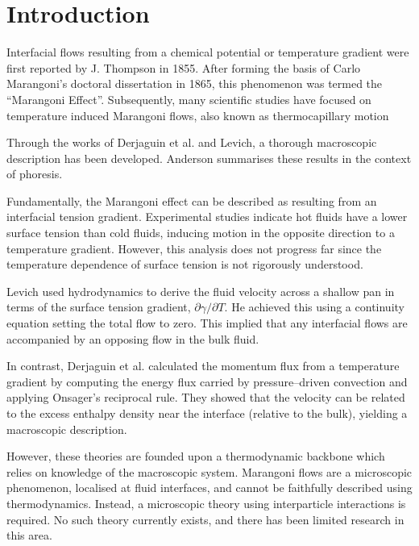 \section{Introduction}
Interfacial flows resulting from a chemical potential or temperature gradient were first reported by J. Thompson in 1855.\cite{JThompson}
After forming the basis of Carlo Marangoni's doctoral dissertation in 1865, this phenomenon was termed the ``Marangoni Effect''.\cite{Marangoni}
Subsequently, many scientific studies have focused on temperature induced Marangoni flows, also known as thermocapillary motion

Through the works of Derjaguin et al.\cite{SurfaceForces} and Levich\cite{Levich}, a thorough macroscopic description has been developed.
Anderson summarises these results in the context of phoresis.\cite{Anderson}

Fundamentally, the Marangoni effect can be described as resulting from an interfacial tension gradient.
Experimental studies indicate hot fluids have a lower surface tension than cold fluids,\cite{Ficalbi1972,Kayser1975} inducing motion in the opposite direction to a temperature gradient.
However, this analysis does not progress far since the temperature dependence of surface tension is not rigorously understood.

Levich used hydrodynamics to derive the fluid velocity across a shallow pan in terms of the surface tension gradient, $\partial \gamma / \partial T$.\cite{Levich}
He achieved this using a continuity equation setting the total flow to zero.
This implied that any interfacial flows are accompanied by an opposing flow in the bulk fluid.

In contrast, Derjaguin et al. calculated the momentum flux from a temperature gradient by computing the energy flux carried by pressure--driven convection and applying Onsager's reciprocal rule.\cite{SurfaceForces}
They showed that the velocity can be related to the excess enthalpy density near the interface (relative to the bulk), yielding a macroscopic description.

However, these theories are founded upon a thermodynamic backbone which relies on knowledge of the macroscopic system.
Marangoni flows are a microscopic phenomenon, localised at fluid interfaces, and cannot be faithfully described using thermodynamics.
Instead, a microscopic theory using interparticle interactions is required.
No such theory currently exists, and there has been limited research in this area.\cite{HolgerBoppHampe}

